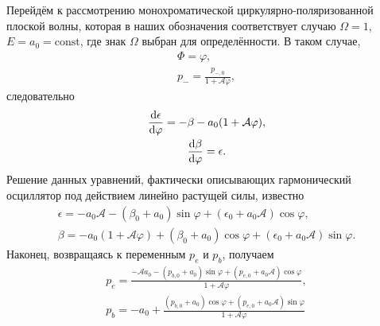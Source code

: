 Перейдём к рассмотрению монохроматической циркулярно-поляризованной плоской волны, которая в наших обозначения соответствует случаю $\Omega=1$, $E=a_0=\text{const}$, где знак $\Omega$ выбран для определённости.
В таком случае,
\begin{gather}
    \Phi = \varphi, \\
    \label{eq:ch1/sec5/cpw_solpm}
    p_- = \frac{p_{-,0}}{1 + \mathcal{A}\varphi},
\end{gather}
следовательно
\begin{gather}
    \dv{\epsilon}{\varphi} = - \beta - a_0 (1+\mathcal{A}\varphi) , \\
    \dv{\beta}{\varphi} = \epsilon.
\end{gather}
Решение данных уравнений, фактически описывающих гармонический осциллятор под действием линейно растущей силы, известно
\begin{gather}
    \epsilon = -a_0 \mathcal{A} - (\beta_0 + a_0)\sin\varphi + (\epsilon_0 + a_0 \mathcal{A}) \cos\varphi, \\
    \beta = -a_0 (1+\mathcal{A}\varphi) + (\beta_0 + a_0)\cos\varphi + (\epsilon_0 + a_0 \mathcal{A})\sin\varphi.
\end{gather}
Наконец, возвращаясь к переменным $p_e$ и $p_b$, получаем
\begin{gather}
    \label{eq:ch1/sec5/cpw_solpe}
    p_e = \frac{-\mathcal{A}a_0 - (p_{b,0} + a_0) \sin\varphi + (p_{e,0} + a_0\mathcal{A})\cos\varphi}{1+\mathcal{A}\varphi}, \\
    \label{eq:ch1/sec5/cpw_solpb}
    p_b = -a_0 + \frac{(p_{b,0} + a_0) \cos\varphi + (p_{e,0} + a_0\mathcal{A})\sin\varphi}{1+\mathcal{A}\varphi}
\end{gather}

